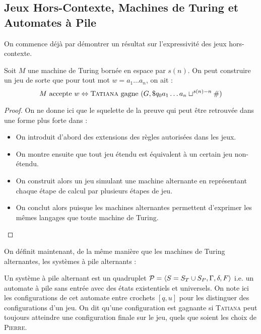 \documentclass{cours}
\begin{document}
\subsection{Jeux Hors-Contexte, Machines de Turing et Automates à Pile}
On commence déjà par démontrer un résultat sur l'expressivité des jeux hors-contexte. 
\begin{theorem}
    Soit $M$ une machine de Turing bornée en espace par $s(n)$. On peut construire un jeu de sorte que pour tout mot $w = a_{1}\ldots a_{n}$, on ait : 
    \[
        M \text{ accepte } w \Leftrightarrow \textsc{Tatiana} \text{ gagne } (G, \$q_{0}a_{1}\ldots a_{n}\sqcup^{s(n) - n}\#)  
    \]
\end{theorem}
\begin{proof}
    On ne donne ici que le squelette de la preuve qui peut être retrouvée dans une forme plus forte dans \cite{cfgames} : 
    \begin{itemize}
        \item On introduit d'abord des extensions des règles autorisées dans les jeux.
        \item On montre ensuite que tout jeu étendu est équivalent à un certain jeu non-étendu. 
        \item On construit alors un jeu simulant une machine alternante en représentant chaque étape de calcul par plusieurs étapes de jeu. 
        \item On conclut alors puisque les machines alternantes permettent d'exprimer les mêmes langages que toute machine de Turing. 
    \end{itemize}
\end{proof}

On définit maintenant, de la même manière que les machines de Turing alternantes, les systèmes à pile alternants : 
\begin{definition}
    Un système à pile alternant est un quadruplet $\mathcal{P} = \left\langle S = S_{T} \cup S_{P}, \Gamma, \delta, F \right\rangle$ i.e. un automate à pile sans entrée avec des états existentiels et universels. On note ici les configurations de cet automate entre crochets $\left[q, u\right]$ pour les distinguer des configurations d'un jeu. On dit qu'une configuration est gagnante si \textsc{Tatiana} peut toujours atteindre une configuration finale sur le jeu, quels que soient les choix de \textsc{Pierre}.
\end{definition}
\end{document}
